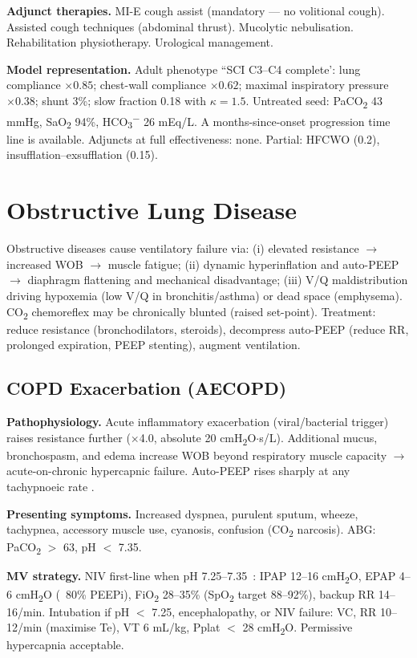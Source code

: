 \textbf{Adjunct therapies.} MI-E cough assist (mandatory --- no volitional cough). Assisted cough techniques (abdominal thrust). Mucolytic nebulisation. Rehabilitation physiotherapy. Urological management.

\textbf{Model representation.} Adult phenotype ``SCI C3--C4 complete': lung compliance $\times0.85$; chest-wall compliance $\times0.62$; maximal inspiratory pressure $\times0.38$; shunt 3\%; slow fraction 0.18 with $\kappa=1.5$. Untreated seed: PaCO\textsubscript{2} 43 mmHg, SaO\textsubscript{2} 94\%, HCO\textsubscript{3}\textsuperscript{$-$} 26 mEq/L. A months-since-onset progression time line is available. Adjuncts at full effectiveness: none. Partial: HFCWO (0.2), insufflation--exsufflation (0.15).

\section{Obstructive Lung Disease}
Obstructive diseases cause ventilatory failure via: (i) elevated resistance $\to$ increased WOB $\to$ muscle fatigue; (ii) dynamic hyperinflation and auto-PEEP $\to$ diaphragm flattening and mechanical disadvantage; (iii) V/Q maldistribution driving hypoxemia (low V/Q in bronchitis/asthma) or dead space (emphysema). CO\textsubscript{2} chemoreflex may be chronically blunted (raised set-point). Treatment: reduce resistance (bronchodilators, steroids), decompress auto-PEEP (reduce RR, prolonged expiration, PEEP stenting), augment ventilation.

\subsection{COPD Exacerbation (AECOPD)}
\textbf{Pathophysiology.} Acute inflammatory exacerbation (viral/bacterial trigger) raises resistance further ($\times$4.0, absolute 20 cmH\textsubscript{2}O$\cdot$s/L). Additional mucus, bronchospasm, and edema increase WOB beyond respiratory muscle capacity $\to$ acute-on-chronic hypercapnic failure. Auto-PEEP rises sharply at any tachypnoeic rate .

\textbf{Presenting symptoms.} Increased dyspnea, purulent sputum, wheeze, tachypnea, accessory muscle use, cyanosis, confusion (CO\textsubscript{2} narcosis). ABG: PaCO\textsubscript{2} $>$ 63, pH $<$ 7.35.

\textbf{MV strategy.} NIV first-line when pH 7.25--7.35~\citep{plant2000,confalonieri2005}: IPAP 12--16 cmH\textsubscript{2}O, EPAP 4--6 cmH\textsubscript{2}O (~80\% PEEPi), FiO\textsubscript{2} 28--35\% (SpO\textsubscript{2} target 88--92\%), backup RR 14--16/min. Intubation if pH $<$ 7.25, encephalopathy, or NIV failure: VC, RR 10--12/min (maximise Te), VT 6 mL/kg, Pplat $<$ 28 cmH\textsubscript{2}O. Permissive hypercapnia acceptable.

